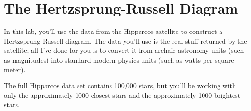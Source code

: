\section{The Hertzsprung-Russell Diagram}

\makelabheader

In this lab, you'll use the data from the Hipparcos satellite
to construct a Hertzsprung-Russell diagram.  The data you'll
use is the real stuff returned by the satellite; all I've done
for you is to convert it from archaic astronomy units (such as
magnitudes) into standard modern physics units (such as watts per
square meter).

The full Hipparcos data set contains 100,000 stars, but you'll be 
working with only the approximately 
1000 closest stars and the approximately 1000 brightest stars.

